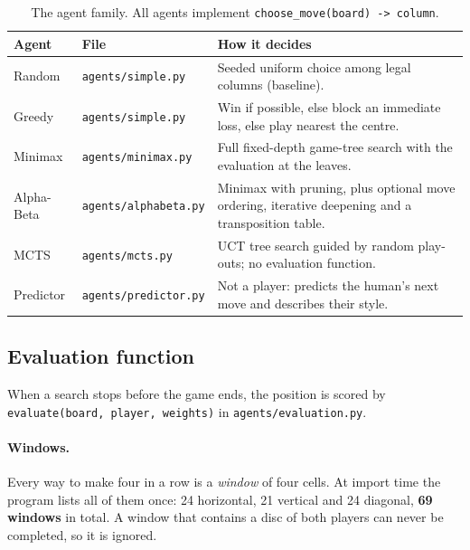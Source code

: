 \documentclass[11pt,a4paper]{article}
\newcommand{\code}[1]{\texttt{\small #1}}
\begin{document}
\begin{table}[ht]
\centering\small
\caption{The agent family. All agents implement \code{choose\_move(board) -> column}.}
\label{tab:agents}
\begin{tabularx}{\textwidth}{@{}l l Y@{}}
\toprule
\textbf{Agent} & \textbf{File} & \textbf{How it decides} \\
\midrule
Random   & \code{agents/simple.py}    & Seeded uniform choice among legal columns (baseline). \\
Greedy   & \code{agents/simple.py}    & Win if possible, else block an immediate loss, else play nearest the centre. \\
Minimax  & \code{agents/minimax.py}   & Full fixed-depth game-tree search with the evaluation at the leaves. \\
Alpha-Beta & \code{agents/alphabeta.py} & Minimax with pruning, plus optional move ordering, iterative deepening and a transposition table. \\
MCTS     & \code{agents/mcts.py}      & UCT tree search guided by random play-outs; no evaluation function. \\
\midrule
Predictor & \code{agents/predictor.py} & Not a player: predicts the human's next move and describes their style. \\
\bottomrule
\end{tabularx}
\end{table}

\subsection{Evaluation function}\label{sec:eval}
When a search stops before the game ends, the position is scored by \code{evaluate(board, player, weights)} in \code{agents/evaluation.py}.

\paragraph{Windows.} Every way to make four in a row is a \emph{window} of four cells. At import time the program lists all of them once: 24 horizontal, 21 vertical and 24 diagonal, \textbf{69 windows} in total. A window that contains a disc of both players can never be completed, so it is ignored.
\end{document}
